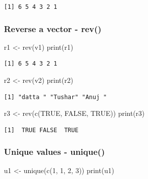 \documentclass[
  letterpaper,
  DIV=11,
  numbers=noendperiod]{scrartcl}
\newenvironment{Shaded}{\begin{snugshade}}{\end{snugshade}}
\newcommand{\ConstantTok}[1]{\textcolor[rgb]{0.56,0.35,0.01}{#1}}
\newcommand{\DecValTok}[1]{\textcolor[rgb]{0.68,0.00,0.00}{#1}}
\newcommand{\FunctionTok}[1]{\textcolor[rgb]{0.28,0.35,0.67}{#1}}
\newcommand{\NormalTok}[1]{\textcolor[rgb]{0.00,0.23,0.31}{#1}}
\newcommand{\OtherTok}[1]{\textcolor[rgb]{0.00,0.23,0.31}{#1}}
\begin{document}
\begin{verbatim}
[1] 6 5 4 3 2 1
\end{verbatim}

\subsubsection{Reverse a vector - rev()}\label{reverse-a-vector---rev}

\begin{Shaded}
\begin{Highlighting}[]
\NormalTok{r1 }\OtherTok{\textless{}{-}} \FunctionTok{rev}\NormalTok{(v1)}
\FunctionTok{print}\NormalTok{(r1)}
\end{Highlighting}
\end{Shaded}

\begin{verbatim}
[1] 6 5 4 3 2 1
\end{verbatim}

\begin{Shaded}
\begin{Highlighting}[]
\NormalTok{r2 }\OtherTok{\textless{}{-}} \FunctionTok{rev}\NormalTok{(v2)}
\FunctionTok{print}\NormalTok{(r2)}
\end{Highlighting}
\end{Shaded}

\begin{verbatim}
[1] "datta " "Tushar" "Anuj " 
\end{verbatim}

\begin{Shaded}
\begin{Highlighting}[]
\NormalTok{r3 }\OtherTok{\textless{}{-}} \FunctionTok{rev}\NormalTok{(}\FunctionTok{c}\NormalTok{(}\ConstantTok{TRUE}\NormalTok{, }\ConstantTok{FALSE}\NormalTok{, }\ConstantTok{TRUE}\NormalTok{))}
\FunctionTok{print}\NormalTok{(r3)}
\end{Highlighting}
\end{Shaded}

\begin{verbatim}
[1]  TRUE FALSE  TRUE
\end{verbatim}

\subsubsection{Unique values - unique()}\label{unique-values---unique}

\begin{Shaded}
\begin{Highlighting}[]
\NormalTok{u1 }\OtherTok{\textless{}{-}} \FunctionTok{unique}\NormalTok{(}\FunctionTok{c}\NormalTok{(}\DecValTok{1}\NormalTok{, }\DecValTok{1}\NormalTok{, }\DecValTok{2}\NormalTok{, }\DecValTok{3}\NormalTok{))}
\FunctionTok{print}\NormalTok{(u1)}
\end{Highlighting}
\end{Shaded}
\end{document}
